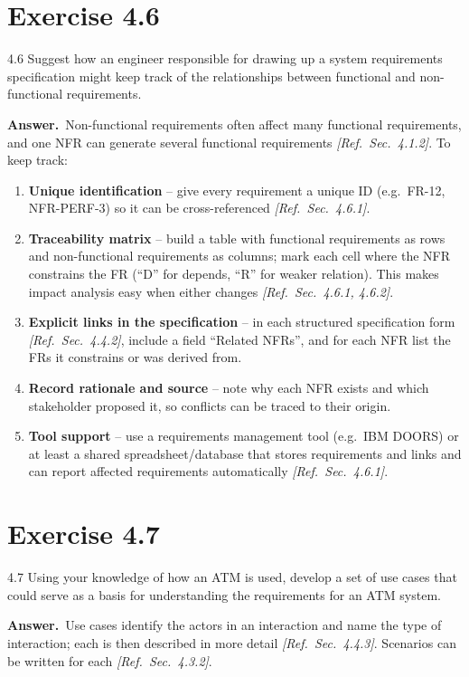 \documentclass[11pt,a4paper]{article}
\newcommand{\answer}{\par\noindent\textbf{Answer.}\ }
\newcommand{\refsec}[1]{\hfill\textit{\small[Ref.\ Sec.~#1]}}
\begin{document}
\section*{Exercise 4.6}
\begin{question}{4.6}
Suggest how an engineer responsible for drawing up a system requirements specification might keep track
of the relationships between functional and non-functional requirements.
\end{question}
\answer Non-functional requirements often affect many functional requirements, and one NFR can generate
several functional requirements \refsec{4.1.2}. To keep track:
\begin{enumerate}[leftmargin=*]
  \item \textbf{Unique identification} -- give every requirement a unique ID (e.g.\ FR-12, NFR-PERF-3) so it can be cross-referenced \refsec{4.6.1}.
  \item \textbf{Traceability matrix} -- build a table with functional requirements as rows and non-functional requirements as columns; mark each cell where the NFR constrains the FR (``D'' for depends, ``R'' for weaker relation). This makes impact analysis easy when either changes \refsec{4.6.1, 4.6.2}.
  \item \textbf{Explicit links in the specification} -- in each structured specification form \refsec{4.4.2}, include a field ``Related NFRs'', and for each NFR list the FRs it constrains or was derived from.
  \item \textbf{Record rationale and source} -- note why each NFR exists and which stakeholder proposed it, so conflicts can be traced to their origin.
  \item \textbf{Tool support} -- use a requirements management tool (e.g.\ IBM DOORS) or at least a shared spreadsheet/database that stores requirements and links and can report affected requirements automatically \refsec{4.6.1}.
\end{enumerate}

\section*{Exercise 4.7}
\begin{question}{4.7}
Using your knowledge of how an ATM is used, develop a set of use cases that could serve as a basis for
understanding the requirements for an ATM system.
\end{question}
\answer Use cases identify the actors in an interaction and name the type of interaction; each is then
described in more detail \refsec{4.4.3}. Scenarios can be written for each \refsec{4.3.2}.
\end{document}
